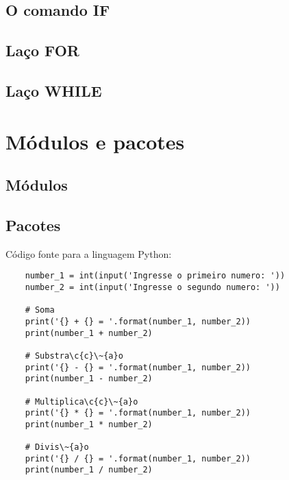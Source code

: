             \subsection{O comando IF}


            \subsection{Laço FOR}

            \subsection{Laço WHILE}


    \section{Módulos e pacotes}



            \subsection{Módulos}



            \subsection{Pacotes}






    Código fonte para a linguagem Python:
    \begin{lstlisting}
    number_1 = int(input('Ingresse o primeiro numero: '))
    number_2 = int(input('Ingresse o segundo numero: '))

    # Soma
    print('{} + {} = '.format(number_1, number_2))
    print(number_1 + number_2)

    # Substra\c{c}\~{a}o
    print('{} - {} = '.format(number_1, number_2))
    print(number_1 - number_2)

    # Multiplica\c{c}\~{a}o
    print('{} * {} = '.format(number_1, number_2))
    print(number_1 * number_2)

    # Divis\~{a}o
    print('{} / {} = '.format(number_1, number_2))
    print(number_1 / number_2)
    \end{lstlisting}





